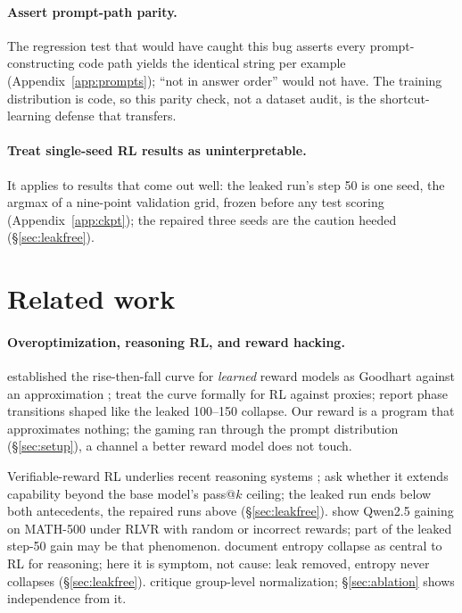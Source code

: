 \documentclass{article}
\begin{document}
\paragraph{Assert prompt-path parity.} The regression test that would have caught this bug asserts every prompt-constructing code path yields the identical string per example (Appendix~\ref{app:prompts}); ``not in answer order'' would not have. The training distribution is code, so this parity check, not a dataset audit, is the shortcut-learning defense that transfers.

\paragraph{Treat single-seed RL results as uninterpretable.} It applies to results that come out well: the leaked run's step 50 is one seed, the argmax of a nine-point validation grid, frozen before any test scoring (Appendix~\ref{app:ckpt}); the repaired three seeds are the caution heeded (\S\ref{sec:leakfree}).

\section{Related work}
\label{sec:related}

\paragraph{Overoptimization, reasoning RL, and reward hacking.} \citet{gao2023scaling}
established the rise-then-fall curve for \emph{learned} reward models as Goodhart against an approximation \citep{stiennon2020}; \citet{karwowski2024goodhart} treat the curve formally for RL against proxies; \citet{pan2022effects} report phase transitions shaped like the leaked 100--150 collapse. Our reward is a program that approximates nothing; the gaming ran through the prompt distribution (\S\ref{sec:setup}), a channel a better reward model does not touch.

Verifiable-reward RL underlies recent reasoning systems \citep{deepseekr1};
\citet{yue2025} ask whether it extends capability beyond the base model's pass@$k$ ceiling; the leaked run ends below both antecedents, the repaired runs above (\S\ref{sec:leakfree}). \citet{shao2025spurious} show Qwen2.5 gaining on MATH-500 under RLVR with random or incorrect rewards; part of the leaked step-50 gain may be that phenomenon.
\citet{cui2025} document entropy collapse as central to RL for reasoning; here it is symptom, not cause: leak removed, entropy never collapses (\S\ref{sec:leakfree}). \citet{drgrpo} critique group-level normalization; \S\ref{sec:ablation} shows independence from it.
\end{document}
